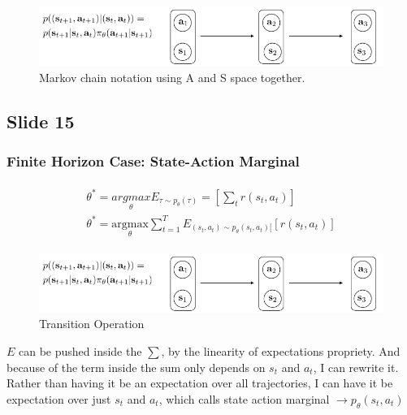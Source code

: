 \documentclass[]{article}
\begin{document}
\begin{figure}
\begin{center}
    \includegraphics[scale=0.5]{cap3img/markovprocess3.png}
\end{center}
\caption{Markov chain notation using A and S space together.}
\label{fig:markovprocesscomp3}
\end{figure}

\subsection*{Slide 15}%
\label{sub:Slide 15}

\subsubsection*{Finite Horizon Case: State-Action Marginal}
\label{sub:Finite Horizon Case: State-Action Marginal}

\begin{gather}
    \begin{align}
    \theta^{*} = \underset{\theta}{argmax}\mathit{E}_{\tau \sim p_{\theta}(\tau)} = \left[ \sum_{t} r(s_{t},a_{t})\right]  \\
    \theta^{*} =\underset{\theta}{\text{argmax}}\sum_{t=1}^{T}\mathit{E_{(s_{t},a_{t})\sim p_{\theta}(s_{t},a_{t})[}} [r(s_{t},a_{t})] 
    \end{align}
\end{gather}


\begin{figure}
\begin{center}
    \includegraphics[scale=0.5]{cap3img/transition.png}
\end{center}
\caption{Transition Operation}
\label{fig:transition}
\end{figure}


\par $\mathit{E}$ can be pushed inside the $\sum$, by the linearity of expectations propriety. And because of the term inside the sum
only depends on $s_{t}$ and $a_{t}$, I can rewrite it. Rather than having it be an expectation over all trajectories, I
can have it be expectation over just  $s_{t}$ and $a_{t}$, which calls state action marginal $\rightarrow
p_{\theta}(s_{t},a_{t})$
\end{document}
